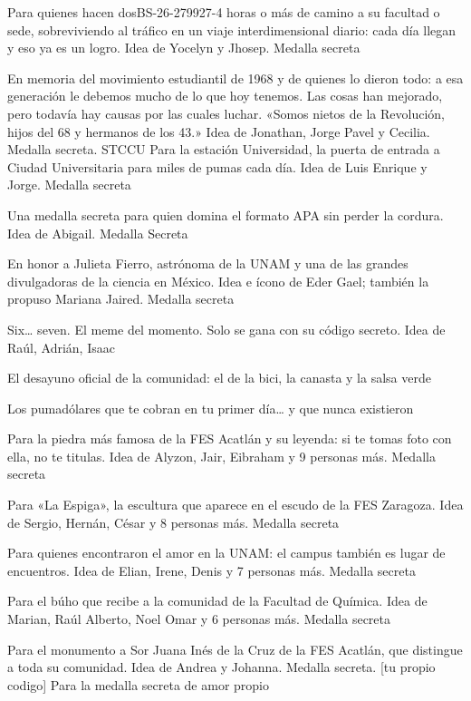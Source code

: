 \begin{description}[leftmargin=1.4cm, style=nextline]
  \item[V14J3R0] Para quienes hacen dosBS-26-279927-4 horas o más de camino a su facultad o sede, sobreviviendo al tráfico en un viaje interdimensional diario: cada día llegan y eso ya es un logro. Idea de Yocelyn y Jhosep. Medalla secreta
  \item[2DEOCT] En memoria del movimiento estudiantil de 1968 y de quienes lo dieron todo: a esa generación le debemos mucho de lo que hoy tenemos. Las cosas han mejorado, pero todavía hay causas por las cuales luchar. «Somos nietos de la Revolución, hijos del 68 y hermanos de los 43.» Idea de Jonathan, Jorge Pavel y Cecilia. Medalla secreta. STCCU Para la estación Universidad, la puerta de entrada a Ciudad Universitaria para miles de pumas cada día. Idea de Luis Enrique y Jorge. Medalla secreta
  \item[M4STR04P4] Una medalla secreta para quien domina el formato APA sin perder la cordura. Idea de Abigail. Medalla Secreta
  \item[JUL1F13RR0] En honor a Julieta Fierro, astrónoma de la UNAM y una de las grandes divulgadoras de la ciencia en México. Idea e ícono de Eder Gael; también la propuso Mariana Jaired. Medalla secreta
  \item[S1XS3V3N] Six… seven. El meme del momento. Solo se gana con su código secreto. Idea de Raúl, Adrián, Isaac
  \item[T4C0S] El desayuno oficial de la comunidad: el de la bici, la canasta y la salsa verde
  \item[PUM4D0L4R] Los pumadólares que te cobran en tu primer día… y que nunca existieron
  \item[P13DR4] Para la piedra más famosa de la FES Acatlán y su leyenda: si te tomas foto con ella, no te titulas. Idea de Alyzon, Jair, Eibraham y 9 personas más. Medalla secreta
  \item[3SP1G4] Para «La Espiga», la escultura que aparece en el escudo de la FES Zaragoza. Idea de Sergio, Hernán, César y 8 personas más. Medalla secreta
  \item[UN4MOR] Para quienes encontraron el amor en la UNAM: el campus también es lugar de encuentros. Idea de Elian, Irene, Denis y 7 personas más. Medalla secreta
  \item[BU1T0FQ] Para el búho que recibe a la comunidad de la Facultad de Química. Idea de Marian, Raúl Alberto, Noel Omar y 6 personas más. Medalla secreta
  \item[S0RJU4N4] Para el monumento a Sor Juana Inés de la Cruz de la FES Acatlán, que distingue a toda su comunidad. Idea de Andrea y Johanna. Medalla secreta. [tu propio codigo] Para la medalla secreta de amor propio

\end{description}
